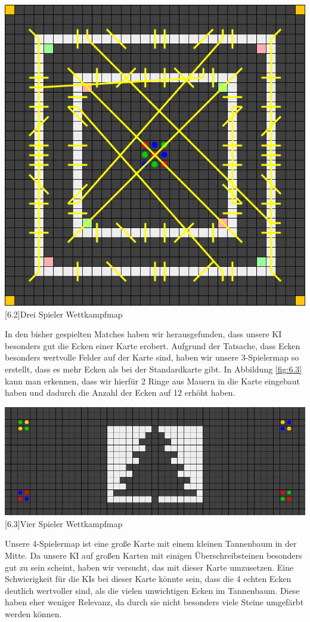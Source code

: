 \documentclass[12pt,a4paper,bibliography=totocnumbered,listof=totocnumbered]{scrartcl}
\begin{document}
	\vspace{1em}
	\begin{minipage}{\linewidth}
		\centering
		\includegraphics[width=0.66\linewidth]{pics/Kapitel_6/DreiSpielerKreise.png}
		[6.2]{Drei Spieler Wettkampfmap}
		\label{fig:6.2}
	\end{minipage}
	\vspace{1em}
	
	In den bisher gespielten Matches haben wir herausgefunden, dass unsere KI besonders gut die Ecken einer Karte erobert. Aufgrund der Tatsache, dass Ecken besonders wertvolle Felder auf der Karte sind, haben wir unsere 3-Spielermap so erstellt, dass es mehr Ecken als bei der Standardkarte gibt. In Abbildung \ref{fig:6.3} kann man erkennen, dass wir hierfür 2 Ringe aus Mauern in die Karte eingebaut haben und dadurch die Anzahl der Ecken auf 12 erhöht haben.
	
	\vspace{1em}
	\begin{minipage}{\linewidth}
		\centering
		\includegraphics[width=0.66\linewidth]{pics/Kapitel_6/TannenbaumMap.PNG}
		[6.3]{Vier Spieler Wettkampfmap}
		\label{fig:6.3}
	\end{minipage}
	\vspace{1em}
	
	Unsere 4-Spielermap ist eine große Karte mit einem kleinen Tannenbaum in der Mitte. Da unsere KI auf großen Karten mit einigen Überschreibsteinen besonders gut zu sein scheint, haben wir versucht, das mit dieser Karte umzusetzen. Eine Schwierigkeit für die KIs bei dieser Karte könnte sein, dass die 4 \glqq echten\grqq{} Ecken deutlich wertvoller sind, als die vielen \glqq unwichtigen \grqq{} Ecken im Tannenbaum. Diese haben eher weniger Relevanz, da durch sie nicht besonders viele Steine umgefärbt werden können.
	
\end{document}
